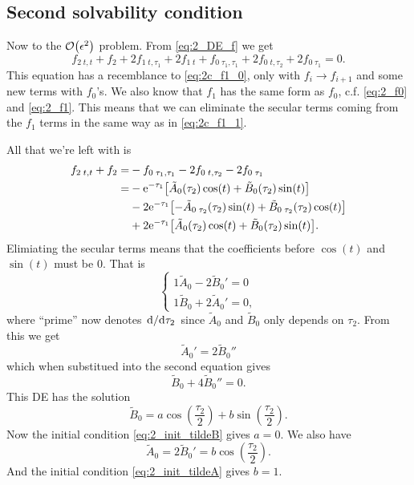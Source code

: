 \documentclass[11pt,letter, swedish, english
]{article}
\begin{document}
\subsection{Second solvability condition}
Now to the $\order{\epsilon^2}$ problem. From \eqref{eq:2_DE_f} we get
\begin{equation}
f_{2\;t,t}+f_2 + 2f_{1\;t,\tau_1} +2f_{1\;t}
+f_{0\;\tau_1,\tau_1}+2f_{0\;t,\tau_2}+2f_{0\;\tau_1}
=0.
\end{equation}
This equation has a recemblance to \eqref{eq:2c_f1_0}, only with
$f_i\to f_{i+1}$ and some new terms with $f_0$'s. We also know that
$f_1$ has the same form as $f_0$, c.f. \eqref{eq:2_f0} and
\eqref{eq:2_f1}. This means that we can eliminate the secular terms
coming from the $f_1$ terms in the same way as in
\eqref{eq:2c_f1_1}. 

All that we're left with is
\begin{equation}
\begin{aligned}
f_{2\;t,t}+f_2 =& %
-f_{0\;\tau_1,\tau_1}-2f_{0\;t,\tau_2}-2f_{0\;\tau_1}\\
=& -\ee^{-\tau_1}
\qty[\tilde{A}_0(\tau_2)\cos(t)+\tilde{B}_0(\tau_2)\sin(t)]\\
&-2\ee^{-\tau_1}
\qty[-\tilde{A}_{0\;\tau_2}(\tau_2)\sin(t)+\tilde{B}_{0\;\tau_2}(\tau_2)\cos(t)]\\
&+2\ee^{-\tau_1}
\qty[\tilde{A}_{0}(\tau_2)\cos(t)+\tilde{B}_0(\tau_2)\sin(t)].
\end{aligned}
\end{equation}
Elimiating the secular terms means that the coefficients before
$\cos(t)$ and $\sin(t)$ must be 0. That is
\begin{equation}
\begin{cases}
1\tilde{A}_{0}-2\tilde{B}_{0}'=0\\
1\tilde{B}_{0}+2\tilde{A}_{0}'=0,
\end{cases}
\end{equation}
where ``prime'' now denotes $\dv*{\tau_2}$ since $\tilde{A}_0$ and
$\tilde{B}_0$ only depends on $\tau_2$.
From this we get
\begin{equation}
\tilde{A}_{0}'=2\tilde{B}_{0}''
\end{equation}
which when substitued into the second equation gives
\begin{equation}
\tilde{B}_0+4\tilde{B}_0''=0.
\end{equation}
This DE has the solution
\begin{equation}
\tilde{B}_0=a\cos(\frac{\tau_2}{2})+b\sin(\frac{\tau_2}{2}).
\end{equation}
Now the initial condition \eqref{eq:2_init_tildeB} gives $a=0$. We
also have
\begin{equation}
\tilde{A}_{0}=2\tilde{B}_{0}'=b\cos(\frac{\tau_2}{2}).
\end{equation}
And the initial condition \eqref{eq:2_init_tildeA} gives $b=1$.
\end{document}
